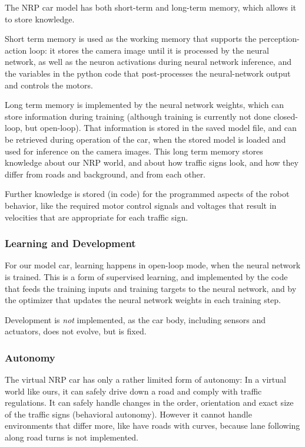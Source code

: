 The NRP car model has both short-term and long-term memory, which allows it to store knowledge.

Short term memory is used as the working memory that supports the perception-action loop: it stores the camera image until it is processed by the neural network, as well as the neuron activations during neural network inference, and the variables in the python code that post-processes the neural-network output and controls the motors.

Long term memory is implemented by the neural network weights, which can store information during training (although training is currently not done closed-loop, but open-loop). That information is stored in the saved model file, and can be retrieved during operation of the car, when the stored model is loaded and used for inference on the camera images.
This long term memory stores knowledge about our NRP world, and about how traffic signs look, and how they differ from roads and background, and from each other.

Further knowledge is stored (in code) for the programmed aspects of the robot behavior, like the required motor control signals and voltages that  result in velocities that are appropriate for each traffic sign.


\subsubsection{Learning and Development}
For our model car, learning happens in open-loop mode, when the neural network is trained. This is a form of supervised learning, and implemented by the code that feeds the training inputs and training targets to the neural network, and by the optimizer that updates the neural network weights in each training step.

Development is \emph{not} implemented, as the car body, including sensors and actuators, does not evolve, but is fixed.

\subsubsection{Autonomy}
The virtual NRP car has only a rather limited form of autonomy: In a virtual world like ours, it can safely drive down a road and comply with traffic regulations. It can safely handle changes in the order, orientation and exact size of the traffic signs (behavioral autonomy). However it cannot handle environments that differ more, like have roads with curves, because lane following along road turns is not implemented.

